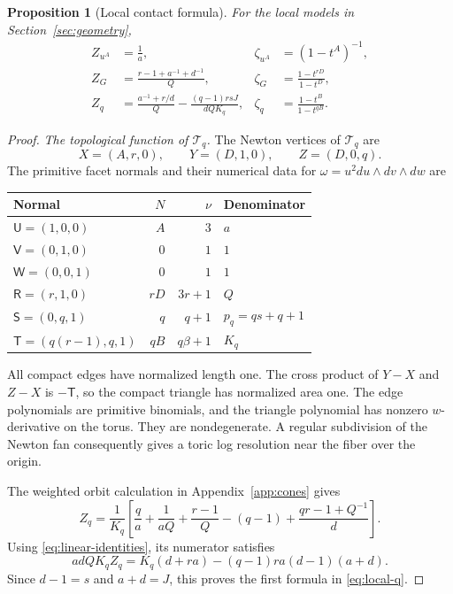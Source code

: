\documentclass[11pt]{article}
\numberwithin{equation}{section}
\newtheorem{proposition}[theorem]{Proposition}
\theoremstyle{definition}
\theoremstyle{remark}
\begin{document}
\begin{proposition}[Local contact formula]\label{prop:local}
For the local models in Section~\ref{sec:geometry},
\begin{align}
 Z_{u^A}&=\frac1a,&
 \zeta_{u^A}&=(1-t^A)^{-1},\label{eq:local-monomial}\\
 Z_G&=\frac{r-1+a^{-1}+d^{-1}}Q,&
 \zeta_G&=\frac{1-t^{rD}}{1-t^D},\label{eq:local-g}\\
 Z_q&=\frac{a^{-1}+r/d}{Q}
       -\frac{(q-1)rsJ}{dQK_q},&
 \zeta_q&=\frac{1-t^B}{1-t^{qB}}.\label{eq:local-q}
\end{align}
\end{proposition}

\begin{proof}
\emph{The topological function of $\mathcal T_q$.}
The Newton vertices of $\mathcal T_q$ are
\[
 X=(A,r,0),\qquad Y=(D,1,0),\qquad Z=(D,0,q).
\]
The primitive facet normals and their numerical data for
$\omega=u^2du\wedge dv\wedge dw$ are
\begin{center}
\begin{tabular}{lrrl}
\toprule
Normal & $N$ & $\nu$ & Denominator\\
\midrule
$\mathsf U=(1,0,0)$ & $A$ & $3$ & $a$\\
$\mathsf V=(0,1,0)$ & $0$ & $1$ & $1$\\
$\mathsf W=(0,0,1)$ & $0$ & $1$ & $1$\\
$\mathsf R=(r,1,0)$ & $rD$ & $3r+1$ & $Q$\\
$\mathsf S=(0,q,1)$ & $q$ & $q+1$ & $p_q=qs+q+1$\\
$\mathsf T=(q(r-1),q,1)$ & $qB$ & $q\beta+1$ & $K_q$\\
\bottomrule
\end{tabular}
\end{center}
All compact edges have normalized length one. The cross product
of $Y-X$ and $Z-X$ is $-\mathsf T$, so the compact triangle has
normalized area one. The edge polynomials are primitive
binomials, and the triangle polynomial has nonzero $w$-derivative
on the torus. They are nondegenerate. A regular subdivision of
the Newton fan consequently gives a toric log resolution near
the fiber over the origin.

The weighted orbit calculation in Appendix~\ref{app:cones}
gives
\begin{equation}\label{eq:local-raw}
 Z_q=\frac1{K_q}\left[
  \frac q a+\frac1{aQ}+\frac{r-1}Q-(q-1)
          +\frac{qr-1+Q^{-1}}d\right].
\end{equation}
Using \eqref{eq:linear-identities}, its numerator satisfies
\[
 adQK_q Z_q=K_q(d+ra)-(q-1)ra(d-1)(a+d).
\]
Since $d-1=s$ and $a+d=J$, this proves the first formula
in \eqref{eq:local-q}.


\end{proof}
\end{document}
